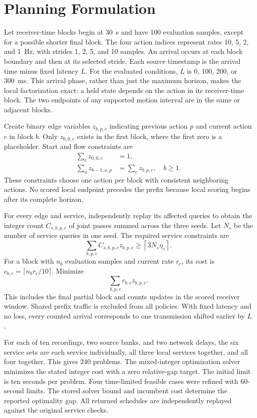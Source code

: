 \documentclass[journal]{IEEEtran}
\begin{document}
\section{Planning Formulation}
Let receiver-time blocks begin at 30~s and have 100 evaluation samples,
except for a possible shorter final block. The four action indices
represent rates 10, 5, 2, and 1~Hz, with strides 1, 2, 5, and 10 samples.
An arrival occurs at each block boundary and then at its selected stride.
Each source timestamp is the arrival time minus fixed latency $L$.
For the evaluated conditions, $L$ is 0, 100, 200, or 300~ms. This arrival
phase, rather than just the maximum horizon, makes the local factorization
exact: a held state depends on the action in its receiver-time block.
The two endpoints of any supported motion interval are in the same or
adjacent blocks.

Create binary edge variables $z_{b,p,c}$ indicating previous action $p$
and current action $c$ in block $b$. Only $z_{0,0,c}$ exists in the first
block, where the first zero is a placeholder. Start and flow constraints
are
\begin{align}
\sum_c z_{0,0,c}&=1,\\
\sum_a z_{b-1,a,p}&=\sum_c z_{b,p,c},\quad b\geq1.
\end{align}
These constraints choose one action per block with consistent neighboring
actions. No scored local endpoint precedes the prefix because local
scoring begins after its complete horizon.

For every edge and service, independently replay its affected queries
to obtain the integer count $C_{s,b,p,c}$ of joint passes summed across
the three seeds. Let $N_s$ be the number of service queries in one seed.
The required service constraints are
\begin{equation}
\sum_{b,p,c} C_{s,b,p,c}z_{b,p,c}
\geq \left\lceil3N_s\eta_s\right\rceil.
\end{equation}
For a block with $n_b$ evaluation samples and current rate $r_c$, its
cost is $c_{b,c}=\lceil n_b r_c/10\rceil$. Minimize
\begin{equation}
\sum_{b,p,c}c_{b,c}z_{b,p,c}.
\end{equation}
This includes the final partial block and counts updates in the scored
receiver window. Shared prefix traffic is excluded from all policies.
With fixed latency and no loss, every counted arrival corresponds to
one transmission shifted earlier by $L$.

For each of ten recordings, two source banks, and two network delays,
the six service sets are each service individually, all three local
services together, and all four together. This gives 240 problems.
The mixed-integer optimization solver minimizes the stated integer cost
with a zero relative-gap target.
The initial limit is ten seconds per problem. Four time-limited feasible
cases were refined with 60-second limits. The stored solver bound and
incumbent cost determine the reported optimality gap. All returned
schedules are independently replayed against the original service checks.
\end{document}
